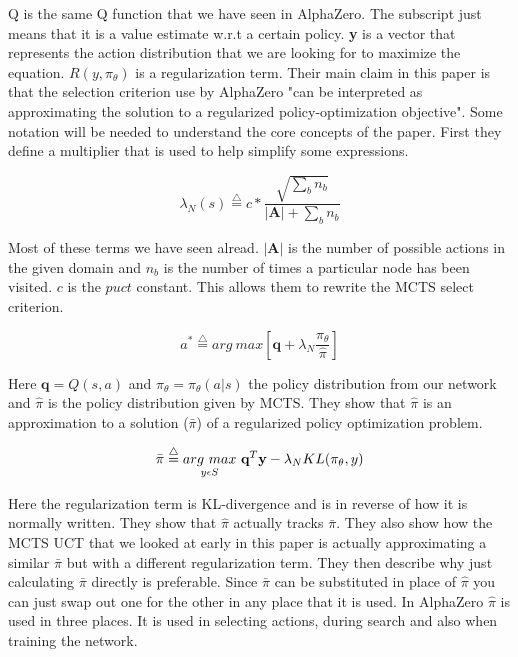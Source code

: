 Q is the same Q function that we have seen in AlphaZero. The subscript just means that it is a value estimate w.r.t a certain policy. \textbf{y} is a vector that represents the action distribution that we are looking for to maximize the equation. $R(y,\pi_\theta)$ is a regularization term. Their main claim in this paper is that the selection criterion use by AlphaZero "can be interpreted as approximating the solution to a regularized policy-optimization objective". Some notation will be needed to understand the core concepts of the paper. First they define a multiplier that is used to help simplify some expressions. 

\begin{equation}
    \lambda_{N} (s) \overset{\triangle}{=} c * \frac{\sqrt{\sum_{b}n_{b}}}{|\mathbf{A}| + \sum_{b}n_{b}}
\end{equation}

Most of these terms we have seen alread. $| \mathbf{A} |$ is the number of possible actions in the given domain and $n_{b}$ is the number of times a particular node has been visited. $c$ is the $puct$ constant. This allows them to rewrite the MCTS select criterion. 

\begin{equation}
    a^{*} \overset{\triangle}{=} arg \ max [\textbf{q} + \lambda_{N} \frac{\pi_{\theta}}{\hat{\pi}}]
\end{equation}

Here $\textbf{q} = Q(s,a)$ and $ \pi_{\theta} = \pi_{\theta}(a | s)$ the policy distribution from our network and $\hat{\pi}$ is the policy distribution given by MCTS. They show that $\hat{\pi}$ is an approximation to a solution (${\bar{\pi}}$) of a regularized policy optimization problem.

\begin{equation}
    \bar{\pi} \overset{\triangle}{=} \underset{y \epsilon S}{arg \ max} \ \textbf{q}^{T}\textbf{y} - \lambda_{N}KL(\pi_{\theta},y)
\end{equation}

Here the regularization term is KL-divergence and is in reverse of how it is normally written. They show that $\hat{\pi}$ actually tracks $\bar{\pi}$. They also show how the MCTS UCT that we looked at early in this paper is actually approximating a similar $\bar{\pi}$ but with a different regularization term. They then describe why just calculating $\bar{\pi}$ directly is preferable. Since $\bar{\pi}$ can be substituted in place of $\hat{\pi}$ you can just swap out one for the other in any place that it is used. In AlphaZero $\hat{\pi}$ is used in three places. It is used in selecting actions, during search and also when training the network. 

